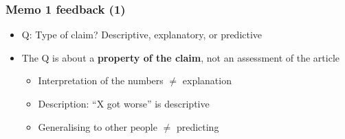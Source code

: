 
\begin{frame}[plain]
  \titlepage
\end{frame}
\note{}

\begin{frame}
\frametitle{Memo 1 feedback (1)}
\centering

\vspace{12pt}
\begin{itemize}
  \item Q: Type of claim? Descriptive, explanatory, or predictive
  \item<2-> The Q is about a \textbf{property of the claim}, not an assessment of the article
  \begin{itemize}
    \item<2-> Interpretation of the numbers $\neq$ explanation
    \item<2-> Description: ``X got worse'' is descriptive
    \item<2-> Generalising to other people $\neq$ predicting
  \end{itemize}
\end{itemize}

\end{frame}
\note{}


